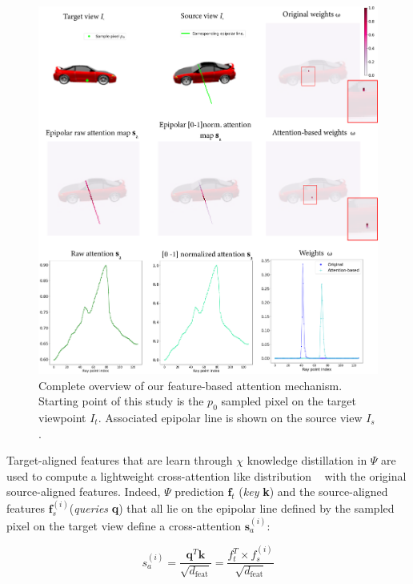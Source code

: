 \begin{figure}[h!]
    \begin{center}
  \includegraphics[width=\linewidth]{images/epinerf/SUPP_COMPLETE_OVERVIEW_OVERLEAF.png}
  \caption{Complete overview of our feature-based attention mechanism. Starting point of this study is the $p_{0}$ sampled pixel on the target viewpoint $I_{t}$. Associated epipolar line is shown on the source view $I_{s}$. }
  \label{fig:attention_overview}
  \end{center}
\end{figure}

Target-aligned features that are learn through $\chi$ knowledge distillation in $\Psi$ are used to compute a lightweight cross-attention like distribution ~\citep{vaswani2017attention} with the original source-aligned features. Indeed, $\Psi$ prediction $\mathbf{f}_{t}$ (\textit{key} \textbf{k}) and the source-aligned features $\mathbf{f}_{s}^{(i)}$(\textit{queries} \textbf{q}) that all lie on the epipolar line defined by the sampled pixel on the target view define a cross-attention $\mathbf{s}_{a}^{(i)}$:

\begin{equation}
    s_{a}^{(i)} = \frac{\mathbf{q}^{T}\mathbf{k}}{\sqrt{d_{\text{feat}}}}= \frac{f_{t}^{T}\times f_{s}^{(i)}}{\sqrt{d_{\text{feat}}}}
\label{eq:attention}
\end{equation}

